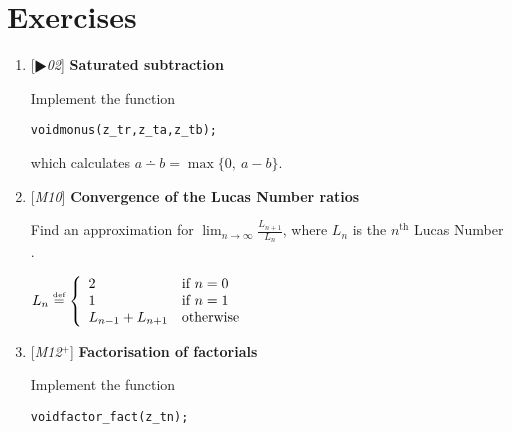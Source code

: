 \chapter{Exercises}
\label{chap:Exercises}

% 
% 
% 
% 


\begin{enumerate}[label=\textbf{\arabic*}.]



\item {[$\RHD$\textit{02}]} \textbf{Saturated subtraction}

Implement the function

\vspace{-1em}
\begin{alltt}
   void monus(z_t r, z_t a, z_t b);
\end{alltt}
\vspace{-1em}

\noindent
which calculates $a \dotminus b = \max \{ 0,~ a - b \}$.



\item {[\textit{M10}]} \textbf{Convergence of the Lucas Number ratios}

Find an approximation for
$\displaystyle{ \lim_{n \to \infty} \frac{L_{n + 1}}{L_n}}$,
where $L_n$ is the $n^{\text{th}}$
Lucas Number .

\( \displaystyle{
    L_n \stackrel{\text{\tiny{def}}}{\text{=}} \left \{ \begin{array}{ll}
      2 & \text{if} ~ n = 0 \\
      1 & \text{if} ~ n = 1 \\
      L_{n - 1} + L_{n + 1} & \text{otherwise}
    \end{array} \right .
}\)



\item {[\textit{M12${}^+$}]} \textbf{Factorisation of factorials}

Implement the function

\vspace{-1em}
\begin{alltt}
   void factor_fact(z_t n);
\end{alltt}
\vspace{-1em}


\end{enumerate}
